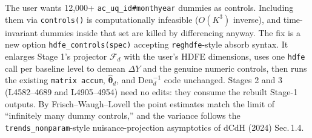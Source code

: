 \documentclass[11pt]{article}
\newcommand{\code}[1]{\texttt{\small #1}}
\newcommand{\1}{\mathbb{1}}
\newcommand{\thetad}{\widehat{\bm{\theta}}_d}
\begin{document}
\begin{tcolorbox}[colback=codebg, colframe=navy, boxrule=0.6pt, arc=1pt,
                  title=\textcolor{navy}{\textbf{The whole proposal in one paragraph}}]
The user wants 12{,}000+ \code{ac\_uq\_id\#monthyear} dummies as controls.
Including them via \code{controls()} is computationally infeasible
($O(K^3)$ inverse), and time-invariant dummies inside that set are killed
by differencing anyway. The fix is a new option
\code{hdfe\_controls(spec)} accepting \code{reghdfe}-style absorb syntax.
It enlarges Stage 1's projector $\mathcal{F}_d$ with the user's HDFE
dimensions, uses one \code{hdfe} call per baseline level to demean
$\Delta Y$ and the genuine numeric controls, then runs the existing
\code{matrix accum}, $\thetad$, and $\mathrm{Den}_d^{-1}$ code unchanged.
Stages 2 and 3 (L4582--4689 and L4905--4954) need no edits: they consume
the rebuilt Stage-1 outputs. By Frisch--Waugh--Lovell the point estimates
match the limit of ``infinitely many dummy controls,'' and the variance
follows the \code{trends\_nonparam}-style nuisance-projection asymptotics
of dCdH (2024) Sec.\,1.4.
\end{tcolorbox}
\end{document}
